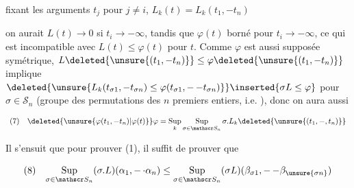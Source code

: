 
fixant les arguments $t_j$ pour $j\ne i$, $L_k(t)=L_k(t_1,-t_n)$ \newline
{}\newline
{}

on aurait $L(t)\to0$ si $t_i\to-\infty$, tandis que $\varphi(t)$  borné pour $t_i\to-\infty$, ce  qui est incompatible avec $L(t)\leq\varphi(t)$ pour  $t$.  Comme  $\varphi$ est aussi supposée symétrique, $L\deleted{\unsure{(t_1,-t_n)}}\leq\varphi\deleted{\unsure{(t_1,-t_n)}}$  implique $\deleted{\unsure{L_k(t_{\sigma1},-t_{\sigma n})\leq\varphi(t_{\sigma1},\mathord{-}\,\mathord{-}t_{\sigma n})}}\inserted{\sigma L\leq\varphi}$ pour  $\sigma\in\mathscr S_n$ (groupe des permutations des $n$ premiers entiers, i.e. ), donc on aura aussi

\[
\begin{array}{ll}
(7)&\displaystyle\deleted{\unsure{\varphi(t_1,-t_n)|\varphi(t)}}\varphi=\operatorname*{Sup}_k\operatorname*{Sup}_{\sigma\in\mathscr S_n}\sigma.L_k\deleted{\unsure{(t_1,-,t_n)}}
\end{array}
\]

Il s'ensuit que  pour prouver (1), il suffit de prouver que  

\[
\begin{array}{ll}
(8)&\displaystyle\operatorname*{Sup}_{\sigma\in\mathscr S_n}(\sigma.L)(\alpha_1,\mathord{-}\,\mathord{\cdot}\alpha_n)\leq\operatorname*{Sup}_{\sigma\in\mathscr S_n}(\sigma L)(\beta_{\sigma1},\mathord{-}\,\mathord{-}\beta_{\unsure{\sigma n}})
\end{array}
\]

